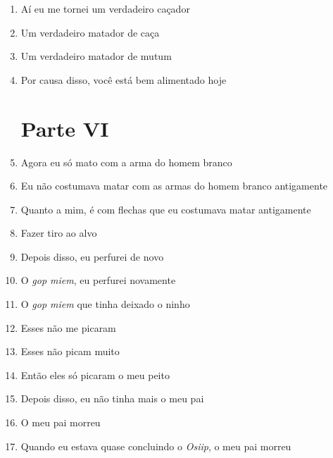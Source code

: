 \begin{enumerate}
 \item Aí eu me tornei um verdadeiro caçador

 \item Um verdadeiro matador de caça

 \item Um verdadeiro matador de mutum

 \item Por causa disso, você está bem alimentado hoje

 \section{Parte VI}

 \item Agora eu só mato com a arma do homem branco

 \item Eu não costumava matar com as armas do homem branco antigamente

 \item Quanto a mim, é com flechas que eu costumava matar antigamente

 \item Fazer tiro ao alvo

 \begin{center}\end{center}

 \item Depois disso, eu perfurei de novo

 \item O \textit{gop miem}, eu perfurei novamente

 \item O \textit{gop miem} que tinha deixado o ninho

 \item Esses não me picaram

 \item Esses não picam muito

 \item Então eles só picaram o meu peito

 \begin{center}\end{center}

 \item Depois disso, eu não tinha mais o meu pai

 \item O meu pai morreu

 \item Quando eu estava quase concluindo o \textit{Osiip}, o meu pai morreu


\end{enumerate}
